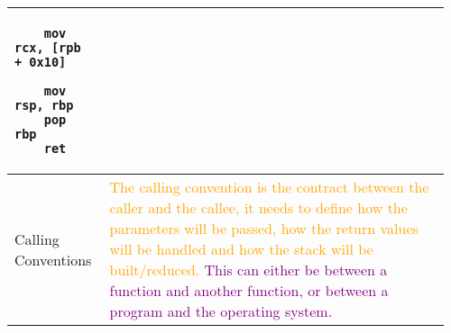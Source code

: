 \documentclass[main.tex,fontsize=8pt,paper=a4,paper=portrait,DIV=calc,]{scrartcl}
\begin{document}
\begin{table}[ht!]
\begin{tabular}{|m{0.2\linewidth}|m{0.755\linewidth}|}
\begin{lstlisting}
    mov rcx, [rpb + 0x10]

    mov rsp, rbp 
    pop rbp 
    ret
\end{lstlisting}\\
\hline
Calling Conventions & 
\textcolor{orange}{The calling convention is the contract between the caller and the callee, it needs to define how the parameters will be passed, how the return values will be handled and how the stack will be built/reduced.}\newline
\textcolor{purple}{This can either be between a function and another function, or between a program and the operating system.}\\
\hline

\hline

\hline

\hline
\end{tabular}
\end{table}
\pagebreak
\begin{table}[ht!]
\begin{tabular}{|m{0.2\linewidth}|m{0.755\linewidth}|}
\hline

\hline

\hline

\hline

\hline

\hline

\hline

\hline

\hline

\hline

\hline
\end{tabular}
\end{table}
\pagebreak
\begin{table}[ht!]
\begin{tabular}{|m{0.2\linewidth}|m{0.755\linewidth}|}
\hline

\hline

\hline

\hline

\hline

\hline

\hline

\hline

\hline

\hline

\hline
\end{tabular}
\end{table}
\end{document}
